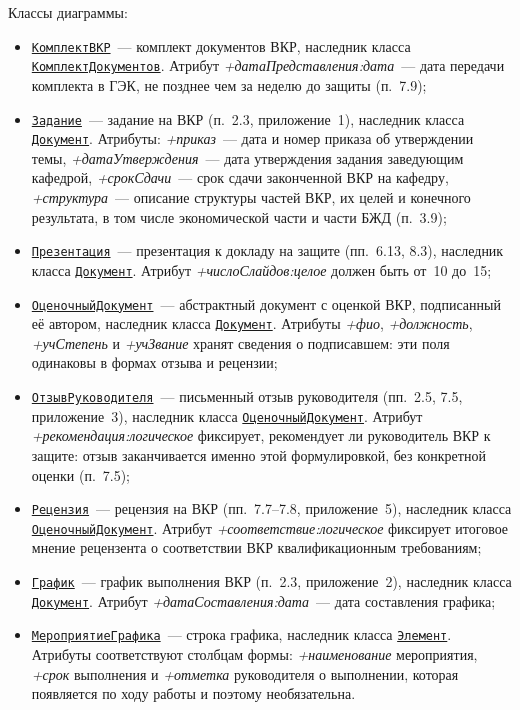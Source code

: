 Классы диаграммы:
\begin{itemize}
	\item \hyperref[fig:UMLpack]{\Verb|КомплектВКР|}~--- комплект документов ВКР, наследник класса \hyperref[fig:UMLroot]{\Verb|КомплектДокументов|}. Атрибут \textit{+датаПредставления:дата}~--- дата передачи комплекта в ГЭК, не позднее чем за неделю до защиты (п.~7.9);
	\item \hyperref[fig:UMLpack]{\Verb|Задание|}~--- задание на ВКР (п.~2.3, приложение~1), наследник класса \hyperref[fig:UMLroot]{\Verb|Документ|}. Атрибуты: \textit{+приказ}~--- дата и номер приказа об утверждении темы, \textit{+датаУтверждения}~--- дата утверждения задания заведующим кафедрой, \textit{+срокСдачи}~--- срок сдачи законченной ВКР на кафедру, \textit{+структура}~--- описание структуры частей ВКР, их целей и конечного результата, в том числе экономической части и части БЖД (п.~3.9);
	\item \hyperref[fig:UMLpack]{\Verb|Презентация|}~--- презентация к докладу на защите (пп.~6.13, 8.3), наследник класса \hyperref[fig:UMLroot]{\Verb|Документ|}. Атрибут \textit{+числоСлайдов:целое} должен быть от~10 до~15;
	\item \hyperref[fig:UMLpack]{\Verb|ОценочныйДокумент|}~--- абстрактный документ с оценкой ВКР, подписанный её автором, наследник класса \hyperref[fig:UMLroot]{\Verb|Документ|}. Атрибуты \textit{+фио}, \textit{+должность}, \textit{+учСтепень} и \textit{+учЗвание} хранят сведения о подписавшем: эти поля одинаковы в формах отзыва и рецензии;
	\item \hyperref[fig:UMLpack]{\Verb|ОтзывРуководителя|}~--- письменный отзыв руководителя (пп.~2.5, 7.5, приложение~3), наследник класса \hyperref[fig:UMLpack]{\Verb|ОценочныйДокумент|}. Атрибут \textit{+рекомендация:логическое} фиксирует, рекомендует ли руководитель ВКР к защите: отзыв заканчивается именно этой формулировкой, без конкретной оценки (п.~7.5);
	\item \hyperref[fig:UMLpack]{\Verb|Рецензия|}~--- рецензия на ВКР (пп.~7.7--7.8, приложение~5), наследник класса \hyperref[fig:UMLpack]{\Verb|ОценочныйДокумент|}. Атрибут \textit{+соответствие:логическое} фиксирует итоговое мнение рецензента о соответствии ВКР квалификационным требованиям;
	\item \hyperref[fig:UMLpack]{\Verb|График|}~--- график выполнения ВКР (п.~2.3, приложение~2), наследник класса \hyperref[fig:UMLroot]{\Verb|Документ|}. Атрибут \textit{+датаСоставления:дата}~--- дата составления графика;
	\item \hyperref[fig:UMLpack]{\Verb|МероприятиеГрафика|}~--- строка графика, наследник класса \hyperref[fig:UMLroot]{\Verb|Элемент|}. Атрибуты соответствуют столбцам формы: \textit{+наименование} мероприятия, \textit{+срок} выполнения и \textit{+отметка} руководителя о выполнении, которая появляется по ходу работы и поэтому необязательна.
\end{itemize}

